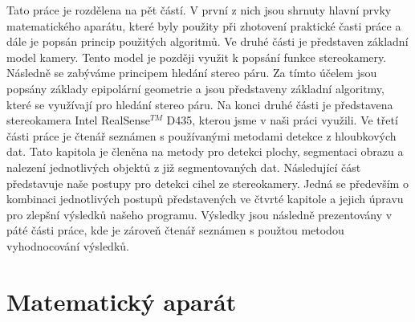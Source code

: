 \documentclass[twoside]{ctuthesis}
\begin{document}
Tato práce je rozdělena na pět částí. V první z nich jsou shrnuty hlavní prvky matematického aparátu, které byly použity při zhotovení praktické časti práce a dále je popsán princip použitých algoritmů.  Ve druhé části je představen základní model kamery. Tento model je později využit k popsání funkce stereokamery. Následně se zabýváme principem hledání stereo páru. Za tímto účelem jsou popsány základy epipolární geometrie a jsou představeny základní algoritmy, které se využívají pro hledání stereo páru. Na konci druhé části je představena stereokamera Intel\textregistered{} RealSense$^{TM}$ D435, kterou jsme v naši práci využili.
Ve třetí části práce je čtenář seznámen s používanými metodami detekce z hloubkových dat. Tato kapitola je členěna na metody pro detekci plochy, segmentaci obrazu a nalezení jednotlivých objektů z již segmentovaných dat.
Následující část představuje naše postupy pro detekci cihel ze stereokamery. Jedná se především o kombinaci jednotlivých postupů představených ve čtvrté kapitole a jejich úpravu pro zlepšní výsledků našeho programu. Výsledky jsou následně prezentovány v páté části práce, kde je zároveň čtenář seznámen s použtou metodou vyhodnocování výsledků.

\chapter{Matematický aparát}
%
\end{document}
